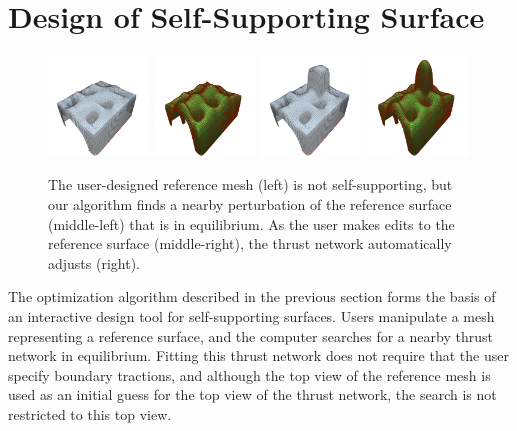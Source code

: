 \documentclass[annual]{acmsiggraph}
\begin{document}
\section{Design of Self-Supporting Surface} \label{sec:design}
\begin{figure}[!tb]
\centering
\includegraphics[width=0.24\textwidth]{fig/build.png} \includegraphics[width=0.24\textwidth]{fig/build-n.png}
\hfill
\includegraphics[width=0.24\textwidth]{fig/build-edited.png} \includegraphics[width=0.24\textwidth]{fig/build-edited-n.png}
\caption{The user-designed reference mesh (left) is not self-supporting, but our algorithm finds a nearby perturbation of the reference surface (middle-left) that is in equilibrium. As the user makes edits to the reference surface (middle-right), the thrust network automatically adjusts (right). \label{fig:vault}}
\end{figure}

The optimization algorithm described in the previous section forms the
basis of an interactive design tool for self-supporting surfaces. Users
manipulate a mesh representing a reference surface, and the computer
searches for a nearby thrust network in equilibrium. Fitting this thrust
network does not require that the user specify boundary tractions, and
although the top view of the reference mesh is used as an initial guess
for the top view of the thrust network, the search is not restricted to
this top view.
\end{document}
